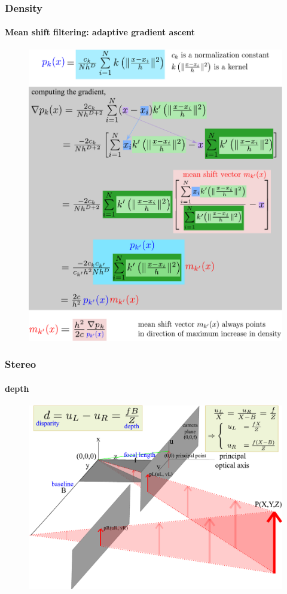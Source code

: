 \begin{frame}
\frametitle{Density}
\framesubtitle{Mean shift filtering: adaptive gradient ascent}
\logoCSIPCPL\mypagenum
	\begin{figure}				
		\includegraphics[height=.85\textheight]{figs/PRML_meanShift.pdf}
	\end{figure}
\end{frame}



\begin{frame}[plain]
\frametitle{Stereo}
\framesubtitle{depth}
\mypagenum
	\begin{changemargin}{-1.3in}{0in}
		\begin{figure}		
			\includegraphics[width=1.3\textwidth]{figs/3D_2_cameras_blockDiagram.pdf}
		\end{figure}
	\end{changemargin}
\end{frame}	


